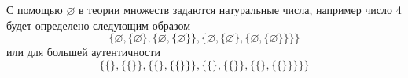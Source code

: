 \begin{commentary}
С помощью $\varnothing$ в теории множеств задаются натуральные числа, например число 4 будет определено следующим образом 
$$\{\varnothing,\{\varnothing\},\{\varnothing,\{\varnothing\}\},\{\varnothing,\{\varnothing\},\{\varnothing,\{\varnothing\}\}\}\}$$
или для большей аутентичности
$$\{\{\},\{\{\}\},\{\{\},\{\{\}\}\},\{\{\},\{\{\}\},\{\{\},\{\{\}\}\}\}\}$$
\end{commentary}
